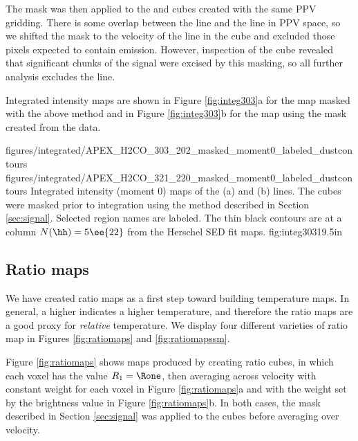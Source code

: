The \para \threeohthree mask was then applied to the \threetwoone and
\threetwotwo cubes created with the same PPV gridding.  There is some overlap
between the \methanol \fourtwotwo line and the \para \threetwotwo line in PPV
space, so we shifted the \para \threeohthree mask to the velocity of the
\methanol line in the \para \threetwotwo cube and excluded those pixels expected
to contain \methanol emission.
However, inspection of the \threetwotwo cube revealed that significant chunks
of the \threetwotwo signal were excised by this masking, so all further
analysis excludes the \threetwotwo line.

Integrated intensity maps are shown in Figure
\ref{fig:integ303}a for the \threeohthree map masked with the above method
and in Figure \ref{fig:integ303}b for the \threetwoone map
using the mask created from the \threeohthree data.


\RotFigureTwoAA
{figures/integrated/APEX_H2CO_303_202_masked_moment0_labeled_dustcontours}
{figures/integrated/APEX_H2CO_321_220_masked_moment0_labeled_dustcontours}
{Integrated intensity (moment 0) maps of the (a) \para \threeohthree and (b)
\threetwoone lines.  The cubes were masked prior to integration using the
method described in Section \ref{sec:signal}.  Selected region names are
labeled.
 The thin black contours are at a column $N(\hh)=5\ee{22}$
\persc from the Herschel SED fit maps.
}
{fig:integ303}{1}{9.5in}

\subsection{Ratio maps}
\label{sec:ratio}
We have created \Rone ratio maps as a first step toward building temperature
maps.  In general, a higher \Rone indicates a higher temperature, and therefore
the ratio maps are a good proxy for \emph{relative} temperature.  We display
four different varieties of ratio map in Figures \ref{fig:ratiomaps} and
\ref{fig:ratiomapssm}.

Figure \ref{fig:ratiomaps} shows maps produced by creating ratio cubes, in
which each voxel has the value $R_1=\Rone$, then averaging across velocity with
constant weight for each voxel in Figure \ref{fig:ratiomaps}a and with the
weight set by the \threeohthree brightness value in Figure
\ref{fig:ratiomaps}b.  In both cases, the mask described in
Section \ref{sec:signal} was applied to the cubes before averaging over
velocity.





